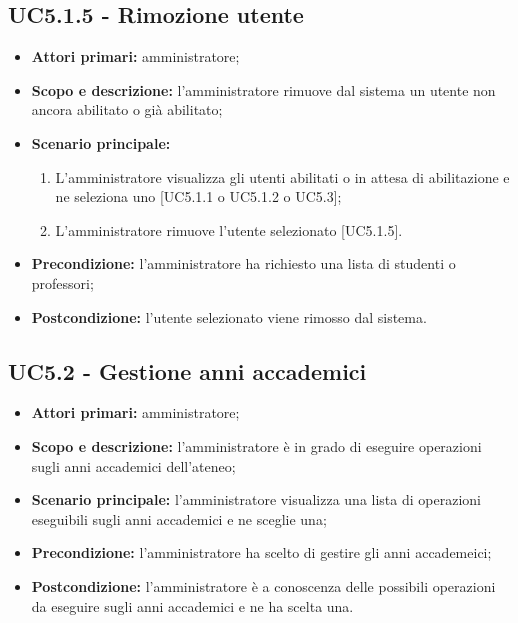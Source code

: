 \documentclass[AnalisiDeiRequisiti.tex]{subfiles}
\begin{document}
\subsection{UC5.1.5 - Rimozione utente}
\begin{itemize}
	\item \textbf{Attori primari:} amministratore;
	\item \textbf{Scopo e descrizione:} l'amministratore rimuove dal sistema un utente non ancora abilitato o già abilitato;
	\item \textbf{Scenario principale:}
	\begin{enumerate}
		\item L'amministratore visualizza gli utenti abilitati o in attesa di abilitazione e ne seleziona uno [UC5.1.1 o UC5.1.2 o UC5.3];
		\item L'amministratore rimuove l'utente selezionato [UC5.1.5].
	\end{enumerate}
	\item \textbf{Precondizione:} l'amministratore ha richiesto una lista di studenti o professori; 
	\item \textbf{Postcondizione:} l'utente selezionato viene rimosso dal sistema.
\end{itemize}
\subsection{UC5.2 - Gestione anni accademici}
\begin{itemize}
	\item \textbf{Attori primari:} amministratore;
	\item \textbf{Scopo e descrizione:} l'amministratore è in grado di eseguire operazioni sugli anni accademici dell'ateneo;
	\item \textbf{Scenario principale:} l'amministratore visualizza una lista di operazioni eseguibili sugli anni accademici e ne sceglie una;
	\item \textbf{Precondizione:} l'amministratore ha scelto di gestire gli anni accademeici; 
	\item \textbf{Postcondizione:} l'amministratore è a conoscenza delle possibili operazioni da eseguire sugli anni accademici e ne ha scelta una.
\end{itemize}
\end{document}
